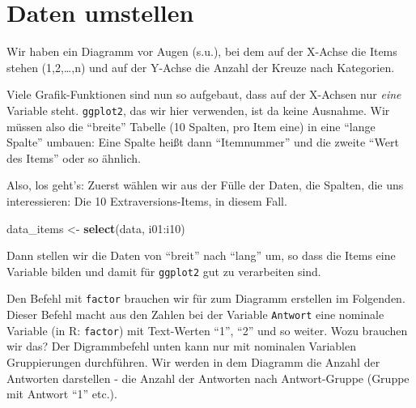 \documentclass[12pt,ngerman,]{book}
\newenvironment{Shaded}{\begin{snugshade}}{\end{snugshade}}
\newcommand{\KeywordTok}[1]{\textcolor[rgb]{0.13,0.29,0.53}{\textbf{{#1}}}}
\newcommand{\DataTypeTok}[1]{\textcolor[rgb]{0.13,0.29,0.53}{{#1}}}
\newcommand{\StringTok}[1]{\textcolor[rgb]{0.31,0.60,0.02}{{#1}}}
\newcommand{\NormalTok}[1]{{#1}}
\renewenvironment{Shaded}{\begin{kframe}}{\end{kframe}}
\begin{document}
\section{Daten umstellen}\label{daten-umstellen}

Wir haben ein Diagramm vor Augen (s.u.), bei dem auf der X-Achse die
Items stehen (1,2,\ldots{},n) und auf der Y-Achse die Anzahl der Kreuze
nach Kategorien.

Viele Grafik-Funktionen sind nun so aufgebaut, dass auf der X-Achsen nur
\emph{eine} Variable steht. \texttt{ggplot2}, das wir hier verwenden,
ist da keine Ausnahme. Wir müssen also die ``breite'' Tabelle (10
Spalten, pro Item eine) in eine ``lange Spalte'' umbauen: Eine Spalte
heißt dann ``Itemnummer'' und die zweite ``Wert des Items'' oder so
ähnlich.

Also, los geht's: Zuerst wählen wir aus der Fülle der Daten, die
Spalten, die uns interessieren: Die 10 Extraversions-Items, in diesem
Fall.

\begin{Shaded}
\begin{Highlighting}[]
\NormalTok{data_items <-}\StringTok{ }\KeywordTok{select}\NormalTok{(data, i01:i10)}
\end{Highlighting}
\end{Shaded}

Dann stellen wir die Daten von ``breit'' nach ``lang'' um, so dass die
Items eine Variable bilden und damit für \texttt{ggplot2} gut zu
verarbeiten sind.

\begin{Shaded}
\end{Shaded}

Den Befehl mit \texttt{factor} brauchen wir für zum Diagramm erstellen
im Folgenden. Dieser Befehl macht aus den Zahlen bei der Variable
\texttt{Antwort} eine nominale Variable (in R: \texttt{factor}) mit
Text-Werten ``1'', ``2'' und so weiter. Wozu brauchen wir das? Der
Digrammbefehl unten kann nur mit nominalen Variablen Gruppierungen
durchführen. Wir werden in dem Diagramm die Anzahl der Antworten
darstellen - die Anzahl der Antworten nach Antwort-Gruppe (Gruppe mit
Antwort ``1'' etc.).
\end{document}
